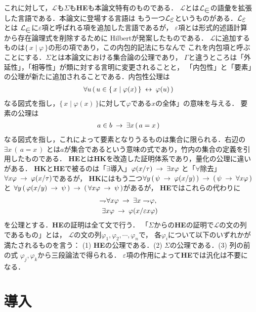 \documentclass[twocolumn,10pt]{jarticle}
\theoremstyle{mystyle}
\newcommand{\lang}[1]{\mathcal{L}_{\scalebox{1.2}{$#1$}}} %
\newcommand{\Set}[2]{\{\, #1 \mid #2\, \}} %
\newcommand{\negation}{\rightharpoondown\hspace{-0.25em}} %
\newcommand{\rarrow}{\hspace{0.25em}\rightarrow\hspace{0.25em}} %
\newcommand{\lrarrow}{\hspace{0.25em}\leftrightarrow\hspace{0.25em}} %
\begin{document}
	これに対して，$\mathcal{L}$も$\Sigma$も{\bf HE}も本論文特有のものである．
	$\mathcal{L}$とは$\lang{\in}$の語彙を拡張した言語である．本論文に登場する言語は
	もう一つ$\lang{\varepsilon}$というものがある．$\lang{\varepsilon}$とは
	$\lang{\in}$に$\varepsilon$項と呼ばれる項を追加した言語であるが，
	$\varepsilon$項とは形式的述語計算から存在論理式を削除するために
	Hilbert\cite{}が発案したものである．
	$\mathcal{L}$に追加するものは$\Set{x}{\varphi}$の形の項であり，この内包的記法にちなんで
	これを内包項と呼ぶことにする．$\Sigma$とは本論文における集合論の公理であり，
	$\Gamma$と違うところは「外延性」，「相等性」が類に対する言明に変更されることと，
	「内包性」と「要素」の公理が新たに追加されることである．内包性公理は
	\begin{align}
		\forall u\, (\, u \in \Set{x}{\varphi(x)} \lrarrow \varphi(u)\, )
	\end{align}
	なる図式を指し，$\Set{x}{\varphi(x)}$に対して$\varphi$である$x$の全体」の意味を与える．
	要素の公理は
	\begin{align}
		a \in b \rarrow \exists x\, (\, a = x\, )
	\end{align}
	なる図式を指し，これによって要素となりうるものは集合に限られる．右辺の$\exists x\, (\, a = x\, )$
	とは$a$が集合であるという意味の式であり，竹内\cite{}の集合の定義を引用したものである．
	{\bf HE}とは{\bf HK}を改造した証明体系であり，量化の公理に違いがある．
	{\bf HK}と{\bf HE}で被るのは「$\exists$導入」$\varphi(x/\tau) \rarrow \exists x \varphi$
	と「$\forall$除去」$\forall x \varphi \rarrow \varphi(x/\tau)$であるが，
	{\bf HK}にはもう二つ$\forall y\, (\, \psi \rarrow \varphi(x/y)\, )
	\rarrow (\, \psi \rarrow \forall x \varphi\, )$と
	$\forall y\, (\, \varphi(x/y) \rarrow \psi\, )
	\rarrow (\, \forall x \varphi \rarrow \psi\, )$があるが，
	{\bf HE}ではこれらの代わりに
	\begin{align}
		\negation \forall x &\varphi \rarrow \exists x \negation \varphi, \\
		\exists x \varphi &\rarrow \varphi(x/\varepsilon x \varphi)
	\end{align}
	を公理とする．{\bf HE}の証明は全て文で行う．
	「$\Sigma$からの{\bf HE}の証明で$\mathcal{L}$の文の列であるもの」とは，
	$\mathcal{L}$の文の列$\varphi_{1},\varphi_{2},\cdots,\varphi_{n}$で，
	各$\varphi_{i}$について以下のいずれかが満たされるものを言う：
	(1) {\bf HE}の公理である．(2) $\Sigma$の公理である．(3) 列の前の式
	$\varphi_{j},\varphi_{k}$から三段論法で得られる．
	$\varepsilon$項の作用によって{\bf HE}では汎化は不要になる．
	
\newpage
\section{導入}
\end{document}
